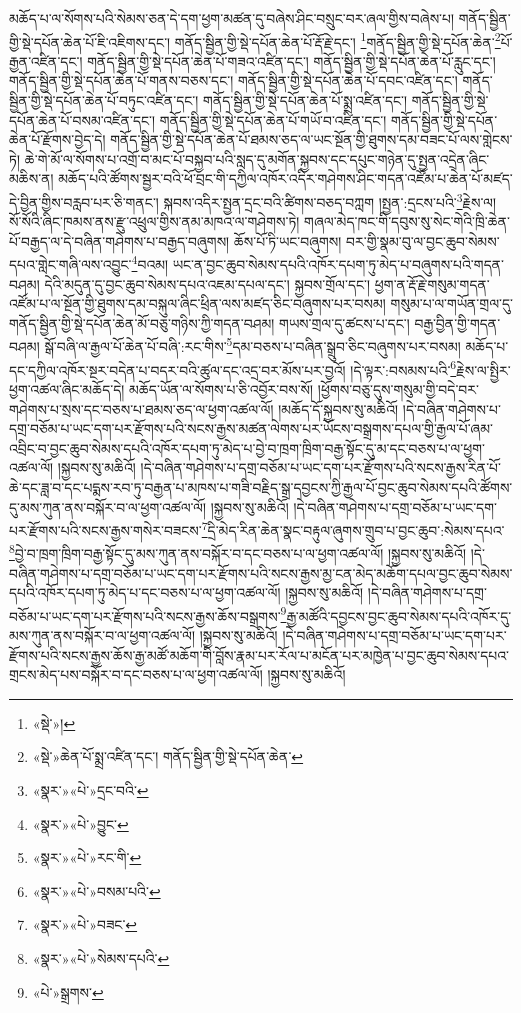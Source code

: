 མཆོད་པ་ལ་སོགས་པའི་སེམས་ཅན་དེ་དག་ཕྱག་མཚན་དུ་བཞེས་ཤིང་བསྲུང་བར་ཞལ་གྱིས་བཞེས་པ། གནོད་སྦྱིན་གྱི་སྡེ་དཔོན་ཆེན་པོ་ཇི་འཇིགས་དང་། གནོད་སྦྱིན་གྱི་སྡེ་དཔོན་ཆེན་པོ་རྡོ་རྗེ་དང་།  \footnote{«སྡེ་»། }གནོད་སྦྱིན་གྱི་སྡེ་དཔོན་ཆེན་\footnote{«སྡེ་»ཆེན་པོ་སྨྲ་འཛིན་དང་། གནོད་སྦྱིན་གྱི་སྡེ་དཔོན་ཆེན་}པོ་རྒྱན་འཛིན་དང་། གནོད་སྦྱིན་གྱི་སྡེ་དཔོན་ཆེན་པོ་གཟའ་འཛིན་དང་། གནོད་སྦྱིན་གྱི་སྡེ་དཔོན་ཆེན་པོ་རླུང་དང་། གནོད་སྦྱིན་གྱི་སྡེ་དཔོན་ཆེན་པོ་གནས་བཅས་དང་། གནོད་སྦྱིན་གྱི་སྡེ་དཔོན་ཆེན་པོ་དབང་འཛིན་དང་། གནོད་སྦྱིན་གྱི་སྡེ་དཔོན་ཆེན་པོ་བཏུང་འཛིན་དང་། གནོད་སྦྱིན་གྱི་སྡེ་དཔོན་ཆེན་པོ་སྨྲ་འཛིན་དང་། གནོད་སྦྱིན་གྱི་སྡེ་དཔོན་ཆེན་པོ་བསམ་འཛིན་དང་། གནོད་སྦྱིན་གྱི་སྡེ་དཔོན་ཆེན་པོ་གཡོ་བ་འཛིན་དང་། གནོད་སྦྱིན་གྱི་སྡེ་དཔོན་ཆེན་པོ་རྫོགས་བྱེད་དེ། གནོད་སྦྱིན་གྱི་སྡེ་དཔོན་ཆེན་པོ་ཐམས་ཅད་ལ་ཡང་སྔོན་གྱི་ཐུགས་དམ་བཟང་པོ་ལས་གླེངས་ཏེ། ཆེ་གེ་མོ་ལ་སོགས་པ་འགྲོ་བ་མང་པོ་བསྐྱབ་པའི་སླད་དུ་མགོན་སྐྱབས་དང་དཔུང་གཉེན་དུ་སྤྱན་འདྲེན་ཞིང་མཆིས་ན། མཆོད་པའི་ཚོགས་སྦྱར་བའི་ཕོ་བྲང་གི་དཀྱིལ་འཁོར་འདིར་གཤེགས་ཤིང་གདན་འཛོམ་པ་ཆེན་པོ་མཛད་དེ་བྱིན་གྱིས་བརླབ་པར་ཅི་གནང་། སྐབས་འདིར་སྤྱན་དྲང་བའི་ཚིགས་བཅད་བཀླག །སྤྱན་:དྲངས་པའི་\footnote{«སྣར་»«པེ་»དྲང་བའི་}རྗེས་ལ། སོ་སོའི་ཞིང་ཁམས་ནས་རྫུ་འཕྲུལ་གྱིས་ནམ་མཁའ་ལ་གཤེགས་ཏེ། གཞལ་མེད་ཁང་གི་དབུས་སུ་སེང་གེའི་ཁྲི་ཆེན་པོ་བརྒྱད་ལ་དེ་བཞིན་གཤེགས་པ་བརྒྱད་བཞུགས། ཆོས་པོ་ཏི་ཡང་བཞུགས། བར་གྱི་སྣམ་བུ་ལ་བྱང་ཆུབ་སེམས་དཔའ་གླེང་གཞི་ལས་འབྱུང་\footnote{«སྣར་»«པེ་»བྱུང་}བའམ། ཡང་ན་བྱང་ཆུབ་སེམས་དཔའི་འཁོར་དཔག་ཏུ་མེད་པ་བཞུགས་པའི་གདན་བཤམ། དེའི་མདུན་དུ་བྱང་ཆུབ་སེམས་དཔའ་འཇམ་དཔལ་དང་། སྐྱབས་གྲོལ་དང་། ཕྱག་ན་རྡོ་རྗེ་གསུམ་གདན་འཛོམ་པ་ལ་སྔོན་གྱི་ཐུགས་དམ་བསྐུལ་ཞིང་ཕྲིན་ལས་མཛད་ཅིང་བཞུགས་པར་བསམ། གསུམ་པ་ལ་གཡོན་གྲལ་དུ་གནོད་སྦྱིན་གྱི་སྡེ་དཔོན་ཆེན་མོ་བཅུ་གཉིས་ཀྱི་གདན་བཤམ། གཡས་གྲལ་དུ་ཚངས་པ་དང་། བརྒྱ་བྱིན་གྱི་གདན་བཤམ། སྒོ་བཞི་ལ་རྒྱལ་པོ་ཆེན་པོ་བཞི་:རང་གིས་\footnote{«སྣར་»«པེ་»རང་གི་}དམ་བཅས་པ་བཞིན་སྒྲུབ་ཅིང་བཞུགས་པར་བསམ། མཆོད་པ་དང་དཀྱིལ་འཁོར་སྔར་བདེན་པ་བདར་བའི་ཚུལ་དང་འདྲ་བར་མོས་པར་བྱའོ། །དེ་ལྟར་:བསམས་པའི་\footnote{«སྣར་»«པེ་»བསམ་པའི་}རྗེས་ལ་སྤྱིར་ཕྱག་འཚལ་ཞིང་མཆོད་དེ། མཆོད་ཡོན་ལ་སོགས་པ་ཅི་འབྱོར་བས་སོ། །ཕྱོགས་བཅུ་དུས་གསུམ་གྱི་བདེ་བར་གཤེགས་པ་སྲས་དང་བཅས་པ་ཐམས་ཅད་ལ་ཕྱག་འཚལ་ལོ། །མཆོད་དོ་སྐྱབས་སུ་མཆིའོ། །དེ་བཞིན་གཤེགས་པ་དགྲ་བཅོམ་པ་ཡང་དག་པར་རྫོགས་པའི་སངས་རྒྱས་མཚན་ལེགས་པར་ཡོངས་བསྒྲགས་དཔལ་གྱི་རྒྱལ་པོ་ཞམ་འབྲིང་བ་བྱང་ཆུབ་སེམས་དཔའི་འཁོར་དཔག་ཏུ་མེད་པ་བྱེ་བ་ཁྲག་ཁྲིག་བརྒྱ་སྟོང་དུ་མ་དང་བཅས་པ་ལ་ཕྱག་འཚལ་ལོ། །སྐྱབས་སུ་མཆིའོ། །དེ་བཞིན་གཤེགས་པ་དགྲ་བཅོམ་པ་ཡང་དག་པར་རྫོགས་པའི་སངས་རྒྱས་རིན་པོ་ཆེ་དང་ཟླ་བ་དང་པདྨས་རབ་ཏུ་བརྒྱན་པ་མཁས་པ་གཟི་བརྗིད་སྒྲ་དབྱངས་ཀྱི་རྒྱལ་པོ་བྱང་ཆུབ་སེམས་དཔའི་ཚོགས་དུ་མས་ཀུན་ནས་བསྐོར་བ་ལ་ཕྱག་འཚལ་ལོ། །སྐྱབས་སུ་མཆིའོ། །དེ་བཞིན་གཤེགས་པ་དགྲ་བཅོམ་པ་ཡང་དག་པར་རྫོགས་པའི་སངས་རྒྱས་གསེར་བཟངས་\footnote{«སྣར་»«པེ་»བཟང་}དྲི་མེད་རིན་ཆེན་སྣང་བརྟུལ་ཞུགས་གྲུབ་པ་བྱང་ཆུབ་:སེམས་དཔའ་\footnote{«སྣར་»«པེ་»སེམས་དཔའི་}བྱེ་བ་ཁྲག་ཁྲིག་བརྒྱ་སྟོང་དུ་མས་ཀུན་ནས་བསྐོར་བ་དང་བཅས་པ་ལ་ཕྱག་འཚལ་ལོ། །སྐྱབས་སུ་མཆིའོ། །དེ་བཞིན་གཤེགས་པ་དགྲ་བཅོམ་པ་ཡང་དག་པར་རྫོགས་པའི་སངས་རྒྱས་མྱ་ངན་མེད་མཆོག་དཔལ་བྱང་ཆུབ་སེམས་དཔའི་འཁོར་དཔག་ཏུ་མེད་པ་དང་བཅས་པ་ལ་ཕྱག་འཚལ་ལོ། །སྐྱབས་སུ་མཆིའོ། །དེ་བཞིན་གཤེགས་པ་དགྲ་བཅོམ་པ་ཡང་དག་པར་རྫོགས་པའི་སངས་རྒྱས་ཆོས་བསྒྲགས་\footnote{«པེ་»སྒྲགས་}རྒྱ་མཚོའི་དབྱངས་བྱང་ཆུབ་སེམས་དཔའི་འཁོར་དུ་མས་ཀུན་ནས་བསྐོར་བ་ལ་ཕྱག་འཚལ་ལོ། །སྐྱབས་སུ་མཆིའོ། །དེ་བཞིན་གཤེགས་པ་དགྲ་བཅོམ་པ་ཡང་དག་པར་རྫོགས་པའི་སངས་རྒྱས་ཆོས་རྒྱ་མཚོ་མཆོག་གི་བློས་རྣམ་པར་རོལ་པ་མངོན་པར་མཁྱེན་པ་བྱང་ཆུབ་སེམས་དཔའ་གྲངས་མེད་པས་བསྐོར་བ་དང་བཅས་པ་ལ་ཕྱག་འཚལ་ལོ། །སྐྱབས་སུ་མཆིའོ། 